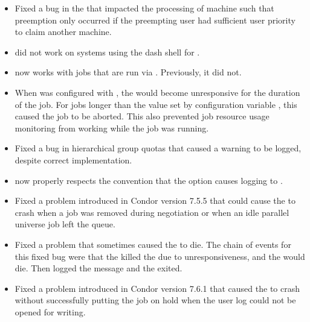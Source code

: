 \begin{itemize}

\item Fixed a bug in the  that impacted the processing 
of machine  such that  
preemption only occurred if the preempting user had sufficient user priority 
to claim another machine. 

\item {} did not work on systems using the 
dash shell for .

\item {} now works with jobs that are run via 
. Previously, it did not. 

\item When  was configured with ,
the  would become unresponsive for the duration of the job. 
For jobs longer than the value set by configuration variable
,
this caused the job to be aborted. 
This also prevented job resource usage monitoring from working 
while the job was running.

\item Fixed a bug in hierarchical group quotas that caused 
a warning to be logged, despite correct implementation.

\item {} now properly respects the convention that
the  option causes  logging to . 

\item Fixed a problem introduced in Condor version 7.5.5 
that could cause the  to crash when a job was removed 
during negotiation or when an idle parallel universe job left the queue. 

\item Fixed a problem that sometimes caused the  to die.
The chain of events for this fixed bug were that
the  killed the  due to unresponsiveness,
and the  would die.
Then  logged the message
 and the  exited. 

\item Fixed a problem introduced in Condor version 7.6.1 
that caused the  to crash without successfully putting the job 
on hold when the user log could not be opened for writing. 


\end{itemize}
